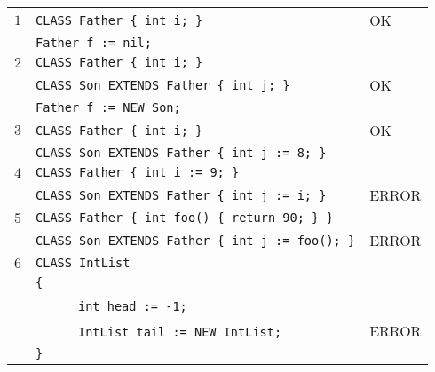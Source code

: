 \documentclass{article}
\begin{document}
\begin{table}[h]
\centering
\begin{tabular}{|l|l|l|}
\hline
 $1$ & \verb"CLASS Father { int i; }"             & OK \\
     & \verb"Father f := nil;"                   &    \\
\hline
 $2$ & \verb"CLASS Father { int i; }"             &    \\
     & \verb"CLASS Son EXTENDS Father { int j; }" & OK \\
     & \verb"Father f := NEW Son;"                &    \\
\hline
 $3$ & \verb"CLASS Father { int i; }"                  & OK \\
     & \verb"CLASS Son EXTENDS Father { int j := 8; }" &    \\
\hline
 $4$ & \verb"CLASS Father { int i := 9; }"             &       \\
     & \verb"CLASS Son EXTENDS Father { int j := i; }" & ERROR \\
\hline
 $5$ & \verb"CLASS Father { int foo() { return 90; } }"    &       \\
     & \verb"CLASS Son EXTENDS Father { int j := foo(); }" & ERROR \\
\hline
 $6$ & \verb"CLASS IntList"                       &       \\
     & \verb"{"                                   &       \\
     & ~ ~ ~ ~\verb"int head := -1;"              &       \\
     & ~ ~ ~ ~\verb"IntList tail := NEW IntList;" & ERROR \\
     & \verb"}"                                   &       \\
\hline

\end{tabular}
\end{table}
\end{document}
